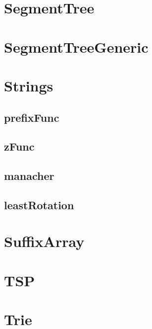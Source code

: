 \documentclass[a4paper]{article}
\begin{document}
\section{SegmentTree}
\section{SegmentTreeGeneric}
\section{Strings}
\subsection{prefixFunc}
\subsection{zFunc}
\subsection{manacher}
\subsection{leastRotation}
\section{SuffixArray}
\section{TSP}
\section{Trie}
\end{document}
